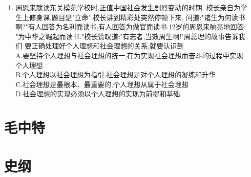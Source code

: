 \documentclass[12pt, a4paper, oneside, UTF8]{ctexbook}
\begin{document}
\begin{enumerate}
    \item 周恩来就读东关模范学校时,正值中国社会发生剧烈变动的时期.
    校长亲自为学生上修身课,题目是"立命".校长讲到精彩处突然停顿下来,
    问道:"诸生为何读书啊?"有人回答为名利而读书,有人回答为做官而读书.12岁的周恩来响亮地回答:
    "为中华之崛起而读书."校长赞叹道:"有志者,当效周生啊!"周总理的故事告诉我们
    要正确处理好个人理想和社会理想的关系,就要认识到 \\
    A.要坚持个人理想与社会理想的统一,在为实现社会理想而奋斗的过程中实现个人理想 \\
    B.个人理想以社会理想为指引,社会理想是对个人理想的凝练和升华 \\
    C.社会理想是最根本、最重要的,个人理想从属于社会理想 \\
    D.社会理想的实现必须以个人理想的实现为前提和基础 
\end{enumerate}
\section{毛中特} 

\section{史纲}
\end{document}
